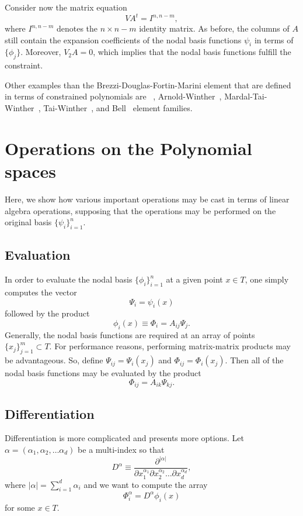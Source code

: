 Consider now the matrix
equation
\begin{equation}
\label{eq:extendedvdmsystem}
V A^t = I^{n,n-m},
\end{equation}
where \( I^{n,n-m} \) denotes the \( n \times n-m \) identity matrix.  
As before, the columns of \( A \) still
contain the expansion coefficients of the nodal basis functions
\( \psi_i \) in terms of \( \{ \phi_j \} \).
Moreover, \( V_2 A = 0 \), which implies that the nodal basis functions
fulfill the constraint. 

Other examples than the Brezzi-Douglas-Fortin-Marini element 
that are defined in terms of constrained polynomials are 
\nedelec~\citep{Nedelec1980}, Arnold-Winther~\citep{ArnoldWinther2002},
Mardal-Tai-Winther~\citep{MardalTaiWinther2002}, 
Tai-Winther~\citep{TaiWinther2006}, and Bell~\citep{Ciarlet2002} element families.


\section{Operations on the Polynomial spaces}
Here, we show how various important operations may be cast
in terms of linear algebra operations, supposing that the operations may be performed on
the original basis \( \{ \psi_i \}_{i=1}^{n} \).

\subsection{Evaluation}
In order to evaluate the nodal basis \( \{ \phi_i \}_{i=1}^{n} \)
at a given point \( x \in T \), one simply computes the vector
\[
\Psi_i = \psi_i(x)
\]
followed by the product
\[
\phi_i(x) \equiv \Phi_i = A_{ij} \Psi_j.
\]
Generally, the nodal basis functions are required at an array of
points \( \{ x_j \}_{j=1}^{m} \subset T \).  For performance reasons,
performing matrix-matrix products may be advantageous.  So, define
\( \Psi_{ij} = \Psi_i(x_j) \)  and \( \Phi_{ij} = \Phi_i(x_j) \).
Then all of the nodal basis functions may be evaluated by the
product
\[
\Phi_{ij} = A_{ik} \Psi_{kj}.
\]
\subsection{Differentiation}
Differentiation is more complicated and presents more options.
Let \( \alpha = ( \alpha_1 , \alpha_2 , \dots \alpha_d ) \) be a
multi-index so that
\[
D^\alpha \equiv \frac{\partial^{|\alpha|}}{\partial
  x_1^{\alpha_1} \partial x_2^{\alpha_2} \dots \partial x_d^{\alpha_d}},
\]
where \( |\alpha| = \sum_{i=1}^{d} \alpha_i \) and we want 
to compute the array
\[
\Phi^\alpha_i = D^\alpha \phi_i(x)
\]
for some \( x \in T \).

